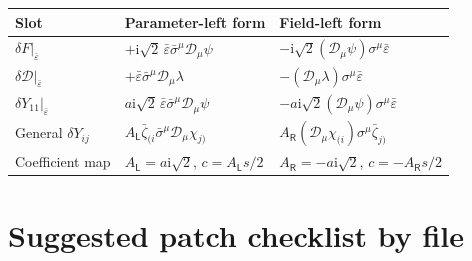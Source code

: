 \documentclass[11pt,a4paper,UTF8]{ctexart}
\numberwithin{equation}{section}
\newcommand{\ii}{\mathrm i}
\newcommand{\cD}{\mathcal D}
\newcommand{\eps}{\varepsilon}
\newcommand{\PL}{\mathsf L}
\newcommand{\PR}{\mathsf R}
\newcommand{\slot}{\big\vert}
\begin{document}
\begin{center}
\begin{tabularx}{\textwidth}{>{\raggedright\arraybackslash}p{}X X}
\toprule
Slot & Parameter-left form & Field-left form \\
\midrule
$\delta F\slot_{\bar\eps}$
& $+\ii\sqrt2\,\bar\eps\bar\sigma^\mu\cD_\mu\psi$
& $-\ii\sqrt2(\cD_\mu\psi)\sigma^\mu\bar\eps$ \\
$\delta\mathscr D\slot_{\bar\eps}$
& $+\bar\eps\bar\sigma^\mu\cD_\mu\lambda$
& $-(\cD_\mu\lambda)\sigma^\mu\bar\eps$ \\
$\delta Y_{11}\slot_{\bar\eps}$
& $a\ii\sqrt2\,\bar\eps\bar\sigma^\mu\cD_\mu\psi$
& $-a\ii\sqrt2(\cD_\mu\psi)\sigma^\mu\bar\eps$ \\
General $\delta Y_{ij}$
& $A_{\PL}\bar\zeta_{(i}\bar\sigma^\mu\cD_\mu\chi_{j)}$
& $A_{\PR}(\cD_\mu\chi_{(i})\sigma^\mu\bar\zeta_{j)}$ \\
Coefficient map
& $A_{\PL}=a\ii\sqrt2$, $c=A_{\PL}s/2$
& $A_{\PR}=-a\ii\sqrt2$, $c=-A_{\PR}s/2$ \\
\bottomrule
\end{tabularx}
\end{center}

\section{Suggested patch checklist by file}
\end{document}
